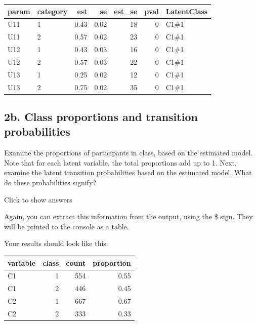 \documentclass[
]{book}
\newenvironment{Shaded}{\begin{snugshade}}{\end{snugshade}}
\newcommand{\NormalTok}[1]{#1}
\newcommand{\SpecialCharTok}[1]{\textcolor[rgb]{0.00,0.00,0.00}{#1}}
\begin{document}
\begin{tabular}[t]{l|l|r|r|r|r|l}
\hline
param & category & est & se & est\_se & pval & LatentClass\\
\hline
U11 & 1 & 0.43 & 0.02 & 18 & 0 & C1\#1\\
\hline
U11 & 2 & 0.57 & 0.02 & 23 & 0 & C1\#1\\
\hline
U12 & 1 & 0.43 & 0.03 & 16 & 0 & C1\#1\\
\hline
U12 & 2 & 0.57 & 0.03 & 22 & 0 & C1\#1\\
\hline
U13 & 1 & 0.25 & 0.02 & 12 & 0 & C1\#1\\
\hline
U13 & 2 & 0.75 & 0.02 & 35 & 0 & C1\#1\\
\hline
\end{tabular}

\hypertarget{b.-class-proportions-and-transition-probabilities}{%
\subsection{2b. Class proportions and transition probabilities}\label{b.-class-proportions-and-transition-probabilities}}

Examine the proportions of participants in class, based on the estimated model. Note that for each latent variable, the total proportions add up to 1. Next, examine the latent transition probabilities based on the estimated model. What do these probabilities signify?

Click to show answers

Again, you can extract this information from the output, using the \$ sign. They will be printed to the console as a table.

Your results should look like this:

\begin{Shaded}
\end{Shaded}

\begin{tabular}[t]{l|r|r|r}
\hline
variable & class & count & proportion\\
\hline
C1 & 1 & 554 & 0.55\\
\hline
C1 & 2 & 446 & 0.45\\
\hline
C2 & 1 & 667 & 0.67\\
\hline
C2 & 2 & 333 & 0.33\\
\hline
\end{tabular}
\end{document}
